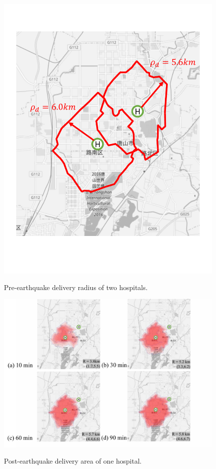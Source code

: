 \documentclass[review,11pt,nonatbib]{elsarticle}
\begin{document}
\begin{figure}[!htp]\centering
\includegraphics[width=12cm]{initial_contour.pdf}\\
\caption{Pre-earthquake delivery radius of two hospitals.}\label{fig7}
\end{figure}

\begin{figure}[!htp]\centering
\includegraphics[width=12cm]{contour_hospital_1.pdf}\\
\caption{Post-earthquake delivery area of one hospital.}\label{fig8}
\end{figure}
\end{document}
